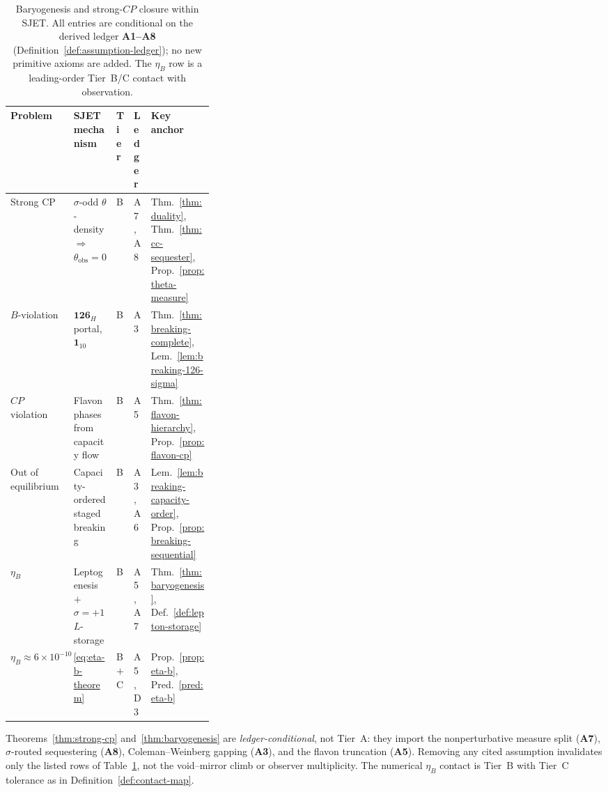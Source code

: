 \begin{table}[ht]
\centering
\small
\renewcommand{\arraystretch}{1.14}
\begin{tabular}{@{}llllp{0.34\linewidth}@{}}
\toprule
\textbf{Problem} & \textbf{SJET mechanism} & \textbf{Tier} &
\textbf{Ledger} & \textbf{Key anchor} \\
\midrule
Strong CP &
  $\sigma$-odd $\theta$-density $\Rightarrow$
  $\theta_{\mathrm{obs}}=0$ &
  B &
  A7, A8 &
  Thm.~\ref{thm:duality},
  Thm.~\ref{thm:cc-sequester},
  Prop.~\ref{prop:theta-measure} \\
\addlinespace
$B$-violation &
  $\mathbf{126}_H$ portal, $\mathbf{1}_{10}$ &
  B &
  A3 &
  Thm.~\ref{thm:breaking-complete},
  Lem.~\ref{lem:breaking-126-sigma} \\
\addlinespace
$CP$ violation &
  Flavon phases from capacity flow &
  B &
  A5 &
  Thm.~\ref{thm:flavon-hierarchy},
  Prop.~\ref{prop:flavon-cp} \\
\addlinespace
Out of equilibrium &
  Capacity-ordered staged breaking &
  B &
  A3, A6 &
  Lem.~\ref{lem:breaking-capacity-order},
  Prop.~\ref{prop:breaking-sequential} \\
\addlinespace
$\eta_B$ &
  Leptogenesis $+$ $\sigma=+1$ $L$-storage &
  B &
  A5, A7 &
  Thm.~\ref{thm:baryogenesis},
  Def.~\ref{def:lepton-storage} \\
\addlinespace
$\eta_B\approx 6\times 10^{-10}$ &
  \eqref{eq:eta-b-theorem} &
  B $+$ C &
  A5, D3 &
  Prop.~\ref{prop:eta-b},
  Pred.~\ref{pred:eta-b} \\
\bottomrule
\end{tabular}
\caption{Baryogenesis and strong-$CP$ closure within SJET. All entries are
conditional on the derived ledger \textbf{A1--A8}
(Definition~\ref{def:assumption-ledger}); no new primitive axioms are added.
The $\eta_B$ row is a leading-order Tier~B/C contact with observation.}
\label{tab:baryogenesis}
\end{table}

\begin{remark}
Theorems~\ref{thm:strong-cp} and~\ref{thm:baryogenesis} are
\emph{ledger-conditional}, not Tier~A: they import the nonperturbative measure
split (\textbf{A7}), $\sigma$-routed sequestering (\textbf{A8}), Coleman--Weinberg
gapping (\textbf{A3}), and the flavon truncation (\textbf{A5}). Removing any
cited assumption invalidates only the listed rows of
Table~\ref{tab:baryogenesis}, not the void--mirror climb or observer
multiplicity. The numerical $\eta_B$ contact is Tier~B with Tier~C tolerance
as in Definition~\ref{def:contact-map}.
\end{remark}